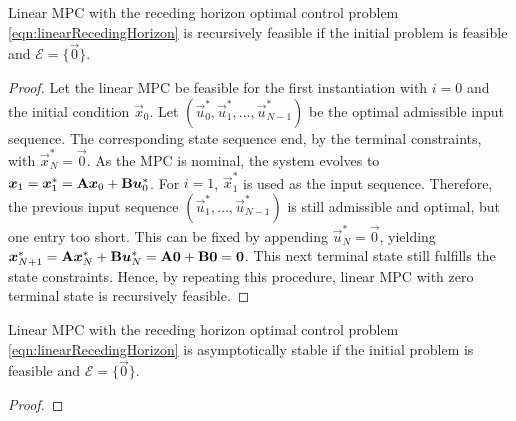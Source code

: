 				\begin{theorem}
					Linear MPC with the receding horizon optimal control problem \eqref{eqn:linearRecedingHorizon} is recursively feasible if the initial problem is feasible and \( \mathcal{E} = \{ \vec{0} \} \).
				\end{theorem}
				\begin{proof}
					Let the linear MPC be feasible for the first instantiation with \(i = 0\) and the initial condition \(\vec{x}_0\). Let \( (\vec{u}_0^\ast, \vec{u}_1^\ast, \dots, \vec{u}_{N - 1}^\ast) \) be the optimal admissible input sequence. The corresponding state sequence end, by the terminal constraints, with \( \vec{x}_N^\ast = \vec{0} \). As the MPC is nominal, the system evolves to \( \bm{x}_1 = \bm{x}_1^\ast = \bm{\mathrm{A}} \bm{x}_0 + \bm{\mathrm{B}} \bm{u}_0^\ast \). For \(i = 1\), \(\vec{x}_1^\ast\) is used as the input sequence. Therefore, the previous input sequence \( (\vec{u}_1^\ast, \dots, \vec{u}_{N - 1}^\ast) \) is still admissible and optimal, but one entry too short. This can be fixed by appending \( \vec{u}_N^\ast = \vec{0} \), yielding \( \bm{x}_{N + 1}^\ast = \bm{\mathrm{A}} \bm{x}_N^\ast + \bm{\mathrm{B}} \bm{u}_N^\ast = \bm{\mathrm{A}} \bm{0} + \bm{\mathrm{B}} \bm{0} = \bm{0} \). This next terminal state still fulfills the state constraints. Hence, by repeating this procedure, linear MPC with zero terminal state is recursively feasible.
				\end{proof}

				\begin{theorem}
					Linear MPC with the receding horizon optimal control problem \eqref{eqn:linearRecedingHorizon} is asymptotically stable if the initial problem is feasible and \( \mathcal{E} = \{ \vec{0} \} \).
				\end{theorem}
				\begin{proof}
				\end{proof}

